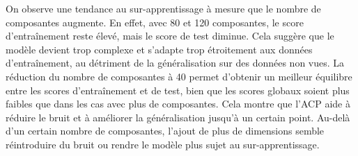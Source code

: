 \documentclass{scrartcl}
\begin{document}
On observe une tendance au sur-apprentissage à mesure que le nombre de composantes augmente. En effet, avec 80 et 120 composantes, le score d'entraînement reste élevé, mais le score de test diminue. Cela suggère que le modèle devient trop complexe et s'adapte trop étroitement aux données d'entraînement, au détriment de la généralisation sur des données non vues.\newline
La réduction du nombre de composantes à 40 permet d'obtenir un meilleur équilibre entre les scores d'entraînement et de test, bien que les scores globaux soient plus faibles que dans les cas avec plus de composantes. Cela montre que l'ACP aide à réduire le bruit et à améliorer la généralisation jusqu'à un certain point. Au-delà d'un certain nombre de composantes, l'ajout de plus de dimensions semble réintroduire du bruit ou rendre le modèle plus sujet au sur-apprentissage.
\end{document}
